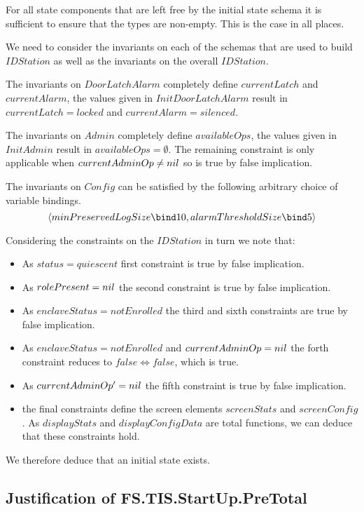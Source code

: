 For all state components that are left free by the initial state
schema it is sufficient to ensure that the types are non-empty. This
is the case in all places.

We need to consider the invariants on each of the schemas that are
used to build $IDStation$ as well as the invariants on the overall
$IDStation$.

The invariants on $DoorLatchAlarm$ completely define $currentLatch$
and $currentAlarm$, the values given in $InitDoorLatchAlarm$ result in
$currentLatch = locked$ and $currentAlarm = silenced$.

The invariants on $Admin$ completely define $availableOps$, the values
given in $InitAdmin$ result in $availableOps = \emptyset$. The
remaining constraint is only applicable when $currentAdminOp \neq
nil$ so is true by false implication.

The invariants on $Config$ can be satisfied by the following arbitrary
choice of variable bindings. 
\[
\langle minPreservedLogSize \bind 10, alarmThresholdSize \bind 5 \rangle
\]

Considering the constraints on the $IDStation$ in turn we note that:
\begin{itemize}
\item
As $status = quiescent$ first constraint is true by false
implication.
\item
As $rolePresent = nil$ the second constraint is true by false
implication.
\item
As $enclaveStatus = notEnrolled$ the third and sixth constraints are true by false
implication.
\item
As $enclaveStatus = notEnrolled$ and $currentAdminOp = nil$ the forth
constraint reduces to $false \iff false$, which is true.
\item
As $currentAdminOp' = nil$ the fifth constraint is true by false implication.
\item
the final constraints define the screen elements $screenStats$ and
$screenConfig$. As $displayStats$ and $displayConfigData$ are total
functions, we can deduce that these constraints hold.
\end{itemize}

We therefore deduce that an initial state exists.

\subsection{Justification of FS.TIS.StartUp.PreTotal}

